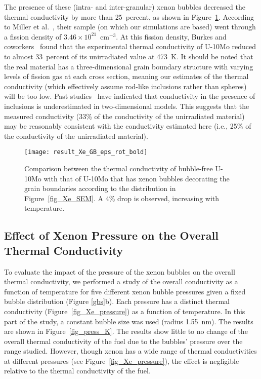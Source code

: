 The presence of these (intra- and inter-granular) xenon bubbles decreased the thermal conductivity by more than 25~percent, as shown in Figure~\ref{fig_eff_K_GB}. According to Miller et al.~\cite{miller2012advantages},
their sample (on which our simulations are based) went through a fission density of $3.46\times10^{21}$~cm$^{-3}$. At this fission density, Burkes and coworkers~\cite{burkes2015thermal} found that the experimental thermal conductivity of U-10Mo reduced to almost 33~percent of its unirradiated value at 473~K\@. It should
be noted that the real material has a three-dimensional grain boundary structure with varying levels of fission gas at each cross section, meaning our estimates of the thermal conductivity (which effectively assume rod-like inclusions rather than spheres) will be too low. Past
studies~\cite{bakker1997using,Schulz1981} have indicated that
conductivity in the presence of inclusions is underestimated in two-dimensional
models. This suggests that the measured conductivity (33\% of the
conductivity of the unirradiated material) may be reasonably consistent with the conductivity estimated here (i.e., 25\% of the conductivity of the unirradiated material).

\begin{figure}
	\centering
	\texttt{[image: result\_Xe\_GB\_eps\_rot\_bold]}
    \caption[Comparing thermal conductivities between the inclusion of GB xenon and withouth xenon]{Comparison between the thermal conductivity of bubble-free U-10Mo
      with that of U-10Mo that has xenon bubbles decorating the grain
      boundaries according to the distribution in Figure~\ref{fig_Xe_SEM}. A
      4\% drop is observed, increasing with temperature.}
	\label{fig_eff_K_GB}
\end{figure}

\subsection{Effect of Xenon Pressure on the Overall Thermal Conductivity}
\label{subsec:xenonpressure}
To evaluate the impact of the pressure of the xenon bubbles on the overall thermal conductivity, we performed a study of the overall conductivity as a function of temperature for five different xenon bubble pressures given a fixed bubble distribution (Figure \ref{gbs}b). Each pressure has a distinct thermal conductivity (Figure~\ref{fig_Xe_pressure}) as a function of temperature. In this part of the study, a constant bubble size was used (radius 1.55~nm). The results are shown in Figure~\ref{fig_press_K}. The results show little to no change of the overall thermal conductivity of the fuel due to the bubbles' pressure over the range studied. However, though xenon has a wide range of thermal conductivities at different pressures (see Figure~\ref{fig_Xe_pressure}), the effect is negligible relative to the thermal conductivity of the fuel. 

